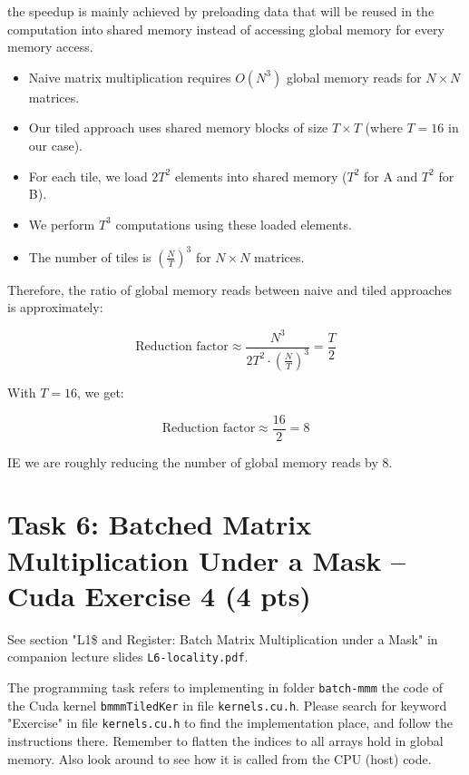 \documentclass{article}
\begin{document}
\begin{itemize}
    the speedup is mainly achieved by preloading data that will be reused in the computation into shared memory instead of accessing global memory for every memory access.

    \begin{itemize}
        \item Naive matrix multiplication requires $O(N^3)$ global memory reads for $N \times N$ matrices.
        \item Our tiled approach uses shared memory blocks of size $T \times T$ (where $T = 16$ in our case).
        \item For each tile, we load $2T^2$ elements into shared memory ($T^2$ for A and $T^2$ for B).
        \item We perform $T^3$ computations using these loaded elements.
        \item The number of tiles is $(\frac{N}{T})^3$ for $N \times N$ matrices.
    \end{itemize}
    
    Therefore, the ratio of global memory reads between naive and tiled approaches is approximately:
    
    \[
    \text{Reduction factor} \approx \frac{N^3}{2T^2 \cdot (\frac{N}{T})^3} = \frac{T}{2}
    \]
    
    With $T = 16$, we get:
    
    \[
    \text{Reduction factor} \approx \frac{16}{2} = 8
    \]
    
    IE we are roughly reducing the number of global memory reads by 8.

\end{itemize}

\section{Task 6: Batched Matrix Multiplication Under a Mask -- Cuda Exercise 4 (4 pts)}

See section "L1\$ and Register: Batch Matrix Multiplication under a Mask" in companion lecture slides \texttt{L6-locality.pdf}.

The programming task refers to implementing in folder \texttt{batch-mmm} the code of the Cuda kernel \texttt{bmmmTiledKer} in file \texttt{kernels.cu.h}. Please search for keyword "Exercise" in file \texttt{kernels.cu.h} to find the implementation place, and follow the instructions there. Remember to flatten the indices to all arrays hold in global memory. Also look around to see how it is called from the CPU (host) code.
\end{document}
